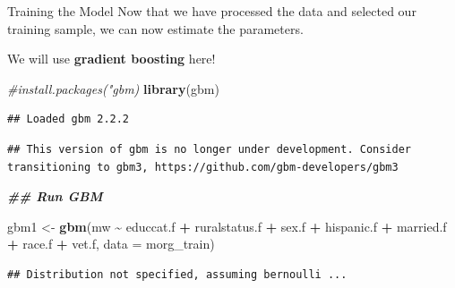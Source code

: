 \documentclass[
  ignorenonframetext,
]{beamer}
\newenvironment{Shaded}{\begin{snugshade}}{\end{snugshade}}
\newcommand{\AttributeTok}[1]{\textcolor[rgb]{0.13,0.29,0.53}{#1}}
\newcommand{\CommentTok}[1]{\textcolor[rgb]{0.56,0.35,0.01}{\textit{#1}}}
\newcommand{\DocumentationTok}[1]{\textcolor[rgb]{0.56,0.35,0.01}{\textbf{\textit{#1}}}}
\newcommand{\FunctionTok}[1]{\textcolor[rgb]{0.13,0.29,0.53}{\textbf{#1}}}
\newcommand{\NormalTok}[1]{#1}
\newcommand{\OtherTok}[1]{\textcolor[rgb]{0.56,0.35,0.01}{#1}}
\newcommand{\SpecialCharTok}[1]{\textcolor[rgb]{0.81,0.36,0.00}{\textbf{#1}}}
\begin{document}
\begin{frame}[fragile]{Training the Model}
\label{training-the-model}
Now that we have processed the data and selected our training sample, we
can now estimate the parameters.

We will use \textbf{gradient boosting} here!

\scriptsize

\begin{Shaded}
\begin{Highlighting}[]
\CommentTok{\#install.packages("gbm)}
\FunctionTok{library}\NormalTok{(gbm)}
\end{Highlighting}
\end{Shaded}

\begin{verbatim}
## Loaded gbm 2.2.2
\end{verbatim}

\begin{verbatim}
## This version of gbm is no longer under development. Consider transitioning to gbm3, https://github.com/gbm-developers/gbm3
\end{verbatim}

\begin{Shaded}
\begin{Highlighting}[]
\DocumentationTok{\#\# Run GBM}

\NormalTok{gbm1 }\OtherTok{\textless{}{-}} \FunctionTok{gbm}\NormalTok{(mw }\SpecialCharTok{\textasciitilde{}}\NormalTok{ educcat.f }\SpecialCharTok{+}\NormalTok{ ruralstatus.f }\SpecialCharTok{+}\NormalTok{ sex.f }\SpecialCharTok{+}\NormalTok{ hispanic.f }\SpecialCharTok{+}\NormalTok{ married.f }\SpecialCharTok{+}\NormalTok{ race.f }\SpecialCharTok{+}\NormalTok{ vet.f,}
            \AttributeTok{data =}\NormalTok{ morg\_train)}
\end{Highlighting}
\end{Shaded}

\begin{verbatim}
## Distribution not specified, assuming bernoulli ...
\end{verbatim}
\end{frame}
\end{document}
